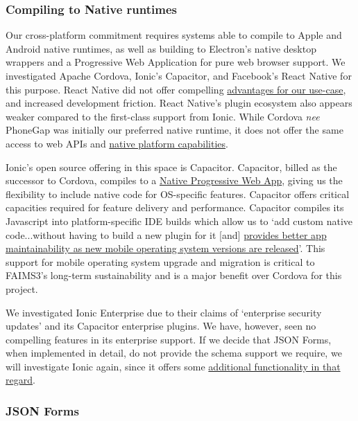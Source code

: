 \documentclass[a4paper,headings=small fontsize=10pt]{scrreprt}
\begin{document}
\subsubsection{Compiling to Native
runtimes}

Our cross-platform commitment requires systems able to compile to Apple
and Android native runtimes, as well as building to Electron's native
desktop wrappers and a Progressive Web Application for pure web browser
support. We investigated Apache Cordova, Ionic's Capacitor, and
Facebook's React Native for this purpose. React Native did not offer
compelling
\href{https://ionicframework.com/blog/ask-a-lead-dev-react-native-or-ionic/}{{advantages
for our use-case}}, and increased development friction. React Native's
plugin ecosystem also appears weaker compared to the first-class support
from Ionic. While Cordova \emph{nee} PhoneGap was initially our
preferred native runtime, it does not offer the same access to web APIs
and
\href{https://ionicframework.com/resources/articles/capacitor-vs-cordova-modern-hybrid-app-development}{{native
platform capabilities}}.

Ionic's open source offering in this space is Capacitor. Capacitor,
billed as the successor to Cordova, compiles to a
\href{https://ionicframework.com/docs/reference/glossary}{{Native
Progressive Web App}}, giving us the flexibility to include native code
for OS-specific features. Capacitor offers critical capacities required
for feature delivery and performance. Capacitor compiles its Javascript
into platform-specific IDE builds which allow us to `add custom native
code...without having to build a new plugin for it [and]
\href{https://capacitorjs.com/docs/cordova}{{provides better app
maintainability as new mobile operating system versions are released}}'.
This support for mobile operating system upgrade and migration is
critical to FAIMS3's long-term sustainability and is a major benefit
over Cordova for this project.

We investigated Ionic Enterprise due to their claims of `enterprise
security updates' and its Capacitor enterprise plugins. We have,
however, seen no compelling features in its enterprise support. If we
decide that JSON Forms, when implemented in detail, do not provide the
schema support we require, we will investigate Ionic again, since it
offers some
\href{https://eclipsesource.com/blogs/2018/12/21/json-forms-goes-mobile-with-ionic/}{{additional
functionality in that regard}}.

\subsubsection{JSON Forms}
\end{document}
